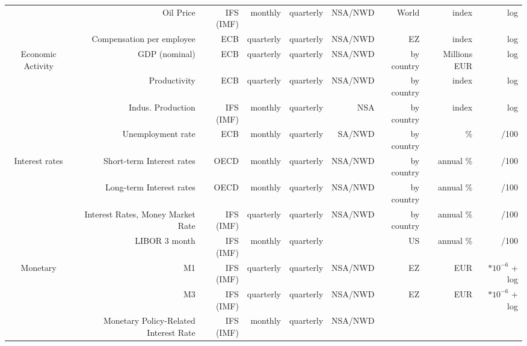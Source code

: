\documentclass[11pt,a4paper]{article}
\begin{document}
\begin{table}[h]
{\begin{tabular}{crrrrrrrr}
      \\
     &
      Oil Price &
      IFS (IMF) &
      monthly &
      quarterly &
      NSA/NWD  &
      World &
      index &
      log
      \\
     &
      Compensation per employee &
      ECB &
      quarterly &
      quarterly &
      NSA/NWD  &
      EZ &
      index &
      log
      \\
      \midrule
    \multirow{4}[8]{*}{Economic Activity} &
      GDP (nominal) &
      ECB &
      quarterly &
      quarterly &
      NSA/NWD  &
      by country &
      Millions EUR &
      log
      \\
     &
      Productivity &
      ECB &
      quarterly &
      quarterly &
      NSA/NWD  &
      by country &
      index &
      log
      \\
     &
      Indus. Production &
      IFS (IMF) &
      monthly &
      quarterly &
      NSA &
      by country &
      index &
      log
      \\
     &
      Unemployment rate &
      ECB &
      monthly &
      quarterly &
      SA/NWD &
      by country &
      \% &
      /100
      \\
      \midrule
    \multirow{4}[8]{*}{Interest rates} &
      Short-term Interest rates &
      OECD &
      monthly &
      quarterly &
      NSA/NWD  &
      by country &
      annual \% &
      /100
      \\
     &
      Long-term Interest rates &
      OECD &
      monthly &
      quarterly &
      NSA/NWD  &
      by country &
      annual \% &
      /100
      \\
     &
      Interest Rates, Money Market Rate &
      IFS (IMF) &
      quarterly &
      quarterly &
      NSA/NWD  &
      by country &
      annual \% &
      /100
      \\
     &
      LIBOR 3 month &
      IFS (IMF) &
      monthly &
      quarterly &
       &
      US &
      annual \% &
      /100
      \\
      \midrule
    \multirow{4}[8]{*}{Monetary} &
      M1 &
      IFS (IMF) &
      quarterly &
      quarterly &
      NSA/NWD  &
      EZ &
      EUR &
       $*10^{-6}$ + log
      \\
     &
      M3 &
      IFS (IMF) &
      quarterly &
      quarterly &
      NSA/NWD  &
      EZ &
      EUR &
      $*10^{-6}$ + log
      \\
     &
      Monetary Policy-Related Interest Rate &
      IFS (IMF) &
      monthly &
      quarterly &
      NSA/NWD  &

\end{tabular}}
\end{table}
\end{document}

